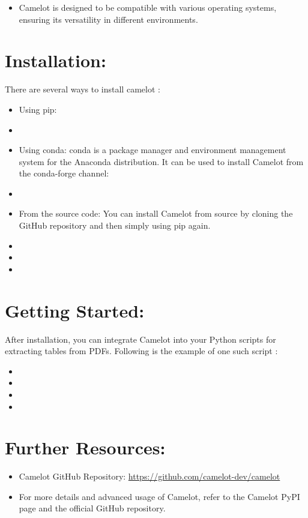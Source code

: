 \begin{itemize}
    \item Camelot is designed to be compatible with various operating systems, ensuring its versatility in different environments.
\end{itemize}

\section{Installation:}
There are several ways to install camelot \cite{camelot:2023}:
\begin{itemize}
    \item Using pip: 
    \item[] 
    \item Using conda: conda is a package manager and environment management system for the Anaconda distribution. It can be used to install Camelot from the conda-forge channel:
    \item[] 
    \item From the source code: You can install Camelot from source by cloning the GitHub repository and then simply using pip again.
    \item[] 
    \item[] 
    \item[] 
\end{itemize}

\section{Getting Started:}
After installation, you can integrate Camelot into your Python scripts for extracting tables from PDFs. Following is the example of one such script \cite{camelot:2023}:
\begin{itemize}
    \item[] 
    \item[] 
    \item[] 
    \item[] 
\end{itemize}
\section{Further Resources:}
\begin{itemize}
    \item Camelot GitHub Repository: \url{https://github.com/camelot-dev/camelot}
    \item For more details and advanced usage of Camelot, refer to the Camelot PyPI page and the official GitHub repository.
\end{itemize}

